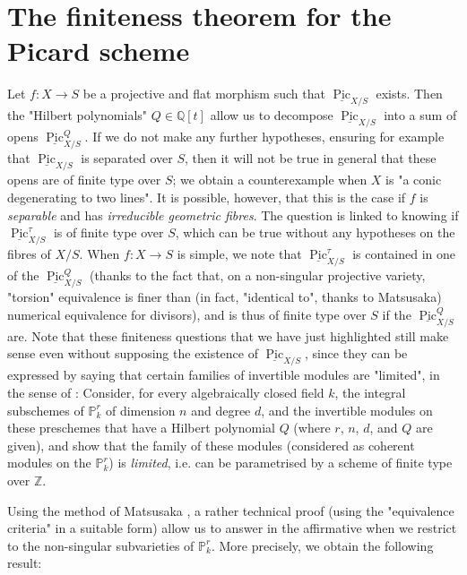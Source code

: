 \section{The finiteness theorem for the Picard scheme}\label{fga3.vi-4}

Let $f\colon X\to S$ be a projective and flat morphism such that $\underline{\operatorname{Pic}}_{X/S}$ exists.
Then the "Hilbert polynomials" $Q\in\mathbb{Q}[t]$ allow us to decompose $\underline{\operatorname{Pic}}_{X/S}$ into a sum of opens $\underline{\operatorname{Pic}}_{X/S}^Q$.
If we do not make any further hypotheses, ensuring for example that $\underline{\operatorname{Pic}}_{X/S}$ is separated over $S$, then it will not be true in general that these opens are of finite type over $S$;
we obtain a counterexample when $X$ is "a conic degenerating to two lines".
It is possible, however, that this is the case if $f$ is \emph{separable} and has \emph{irreducible geometric fibres}.
The question is linked to knowing if $\underline{\operatorname{Pic}}_{X/S}^\tau$ is of finite type over $S$, which can be true without any hypotheses on the fibres of $X/S$.
When $f\colon X\to S$ is simple, we note that $\underline{\operatorname{Pic}}_{X/S}^\tau$ is contained in one of the $\underline{\operatorname{Pic}}_{X/S}^Q$ (thanks to the fact that, on a non-singular projective variety, "torsion" equivalence is finer than (in fact, "identical to", thanks to Matsusaka) numerical equivalence for divisors), and is thus of finite type over $S$ if the $\underline{\operatorname{Pic}}_{X/S}^Q$ are.
Note that these finiteness questions that we have just highlighted still make sense even without supposing the existence of $\underline{\operatorname{Pic}}_{X/S}$, since they can be expressed by saying that certain families of invertible modules are "limited", in the sense of :
Consider, for every algebraically closed field $k$, the integral subschemes of $\mathbb{P}_k^r$ of dimension $n$ and degree $d$, and the invertible modules on these preschemes that have a Hilbert polynomial $Q$ (where $r$, $n$, $d$, and $Q$ are given), and show that the family of these modules (considered as coherent modules on the $\mathbb{P}_k^r$) is \emph{limited}, i.e. can be parametrised by a scheme of finite type over $\mathbb{Z}$.

Using the method of Matsusaka \cite{Mat1957}, a rather technical proof (using the "equivalence criteria" in a suitable form) allow us to answer in the affirmative when we restrict to the non-singular subvarieties of $\mathbb{P}_k^r$.
More precisely, we obtain the following result:

